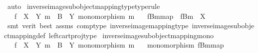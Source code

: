 \begin{isabellebody}
\ auto%
\endisatagproof
{\isafoldproof}%
%
\isadelimproof
\isanewline
%
\endisadelimproof
\isanewline
{}\isamarkupfalse%
\ inverse{\isacharunderscore}{\kern0pt}image{\isacharunderscore}{\kern0pt}subobject{\isacharunderscore}{\kern0pt}mapping{\isacharunderscore}{\kern0pt}type{\isacharbrackleft}{\kern0pt}type{\isacharunderscore}{\kern0pt}rule{\isacharbrackright}{\kern0pt}{\isacharcolon}{\kern0pt}\isanewline
\ \ \ {\isachardoublequoteopen}f\ {\isacharcolon}{\kern0pt}\ X\ {\isasymrightarrow}\ Y{\isachardoublequoteclose}\ {\isachardoublequoteopen}m\ {\isacharcolon}{\kern0pt}\ B\ {\isasymrightarrow}\ Y{\isachardoublequoteclose}\ {\isachardoublequoteopen}monomorphism\ m{\isachardoublequoteclose}\isanewline
\ \ \ {\isachardoublequoteopen}{\isacharbrackleft}{\kern0pt}f\isactrlsup {\isacharminus}{\kern0pt}B{\isasymrparr}\isactrlbsub m\isactrlesub {\isacharbrackright}{\kern0pt}map\ {\isacharcolon}{\kern0pt}\ f\isactrlsup {\isacharminus}{\kern0pt}B{\isasymrparr}\isactrlbsub m\isactrlesub \ {\isasymrightarrow}\ X{\isachardoublequoteclose}\isanewline
%
\isadelimproof
\ \ %
\endisadelimproof
%
\isatagproof
{}\isamarkupfalse%
\ {\isacharparenleft}{\kern0pt}smt\ {\isacharparenleft}{\kern0pt}verit{\isacharcomma}{\kern0pt}\ best{\isacharparenright}{\kern0pt}\ assms\ comp{\isacharunderscore}{\kern0pt}type\ inverse{\isacharunderscore}{\kern0pt}image{\isacharunderscore}{\kern0pt}mapping{\isacharunderscore}{\kern0pt}type\ inverse{\isacharunderscore}{\kern0pt}image{\isacharunderscore}{\kern0pt}subobject{\isacharunderscore}{\kern0pt}mapping{\isacharunderscore}{\kern0pt}def{}\ left{\isacharunderscore}{\kern0pt}cart{\isacharunderscore}{\kern0pt}proj{\isacharunderscore}{\kern0pt}type{\isacharparenright}{\kern0pt}%
\endisatagproof
{\isafoldproof}%
%
\isadelimproof
\isanewline
%
\endisadelimproof
\isanewline
{}\isamarkupfalse%
\ inverse{\isacharunderscore}{\kern0pt}image{\isacharunderscore}{\kern0pt}subobject{\isacharunderscore}{\kern0pt}mapping{\isacharunderscore}{\kern0pt}mono{\isacharcolon}{\kern0pt}\isanewline
\ \ \ {\isachardoublequoteopen}f\ {\isacharcolon}{\kern0pt}\ X\ {\isasymrightarrow}\ Y{\isachardoublequoteclose}\ {\isachardoublequoteopen}m\ {\isacharcolon}{\kern0pt}\ B\ {\isasymrightarrow}\ Y{\isachardoublequoteclose}\ {\isachardoublequoteopen}monomorphism\ m{\isachardoublequoteclose}\isanewline
\ \ \ {\isachardoublequoteopen}monomorphism\ {\isacharparenleft}{\kern0pt}{\isacharbrackleft}{\kern0pt}f\isactrlsup {\isacharminus}{\kern0pt}B{\isasymrparr}\isactrlbsub m\isactrlesub {\isacharbrackright}{\kern0pt}map{\isacharparenright}{\kern0pt}{\isachardoublequoteclose}\isanewline

\end{isabellebody}
